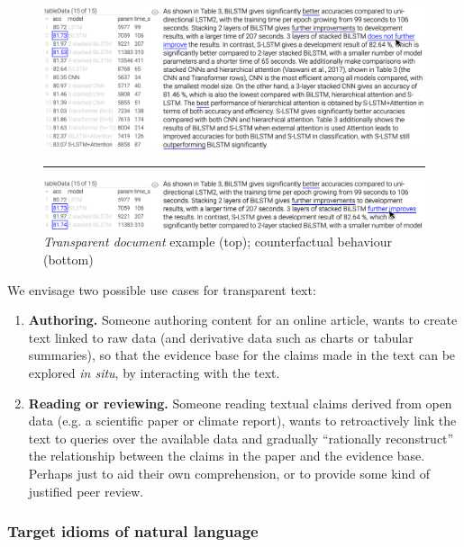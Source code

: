 \begin{figure}%
    \centering
    \includegraphics[width=\linewidth]{fig/scigen-1805.02474v1-10-with-pointer.png}
    \vspace{1mm}
    \hrule
    \includegraphics[width=\linewidth]{fig/scigen-1805.02474v1-10-counterfactual-with-pointer.png}
    \caption{\emph{Transparent document} example (top); counterfactual behaviour (bottom)}\label{fig:scigen-example-website}
\end{figure}

We envisage two possible use cases for transparent text:

\begin{enumerate}
\item \textbf{Authoring.} Someone authoring content for an online article, wants to create text
linked to raw data (and derivative data such as charts or tabular summaries), so that the evidence base for
the claims made in the text can be explored \emph{in situ}, by interacting with the text.

\item \textbf{Reading or reviewing.} Someone reading textual claims derived from open data (e.g. a
scientific paper or climate report), wants to retroactively link the text to queries over the available data
and gradually ``rationally reconstruct'' the relationship between the claims in the paper and the evidence
base. Perhaps just to aid their own comprehension, or to provide some kind of justified peer review.
\end{enumerate}



\subsubsection{Target idioms of natural language}

